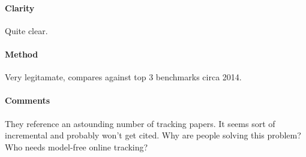 \paragraph{Clarity} Quite clear. 
\paragraph{Method} Very legitamate, compares against top 3 benchmarks circa 2014.
\paragraph{Comments} They reference an astounding number of tracking papers. It seems sort of incremental and probably won't get cited. Why are people solving this problem? Who needs model-free online tracking?
